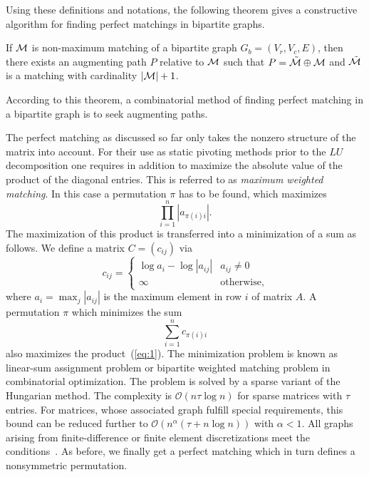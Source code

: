 Using these definitions and notations,
the following theorem \cite{Berge} gives a
constructive algorithm for finding perfect matchings in bipartite
graphs.

\begin{theorem}\label{theo:Berge}
If $\mathcal{M}$ is non-maximum matching of a bipartite graph $G_b= (V_r, V_c,E)$, 
then there exists an augmenting path $P$ relative to $\mathcal{M}$ such that
 $P=\tilde{\mathcal{M}} \oplus \mathcal{M}$ and $\tilde{\mathcal{M}}$
is a matching with cardinality $|\mathcal{M}|+1$.
\end{theorem}
According to this theorem, a combinatorial method of finding perfect
matching in a bipartite graph is to seek augmenting paths. 

The
perfect matching as discussed so far only takes the nonzero structure
of the matrix into account. 
For their use as static pivoting methods prior to the $LU$ decomposition
one requires in addition to
maximize the absolute value of the product of the diagonal entries. 
This is referred to as
\emph{maximum weighted matching}. In this case a permutation
$\pi$ has to be found, which maximizes
\begin{equation}
  \prod_{i=1}^n |a_{\pi(i)i}|. \label{eq:1}
\end{equation}
The maximization of this product is transferred into a minimization of a sum as follows. We define a matrix $C = (c_{ij})$ via
\[
  c_{ij} = 
  \begin{cases}
    \log a_i - \log |a_{ij}| & a_{ij} \neq 0 \\
    \infty                     & \text{otherwise},
  \end{cases}
\]
where $a_i = \max_j |a_{ij}|$  is the maximum element in row $i$ of
matrix $A$. A permutation $\pi$ which minimizes the sum 
\[
  \label{eq:4}
  \sum_{i=1}^n c_{\pi(i)i} 
\]
also maximizes the product~(\ref{eq:1}). The minimization problem is
known as linear-sum assignment problem or bipartite weighted matching
problem in combinatorial optimization.  The problem is solved by a
sparse variant of the Hungarian method. The complexity is
 $\mathcal{O}(n \tau \log n )$ for
sparse matrices with $\tau$ entries. For matrices, whose associated
graph fulfill special requirements, this bound can be reduced further
to $\mathcal{O}(n^\alpha (\tau + n \log n))$ with $\alpha < 1$.  All graphs
arising from finite-difference or finite element discretizations meet
the conditions~\cite{gupta:99}. As before, we finally get a perfect
matching which in turn defines a nonsymmetric permutation.


